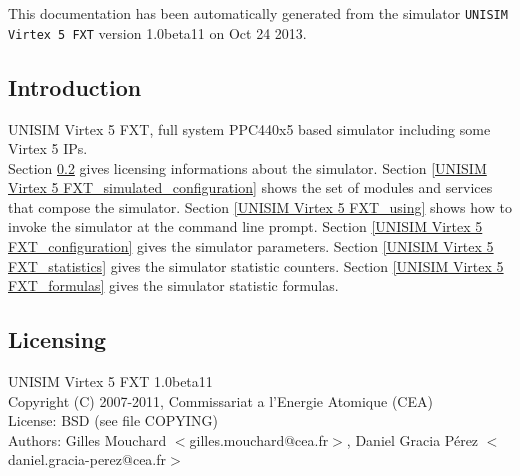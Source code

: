 This documentation has been automatically generated from the simulator \texttt{UNISIM Virtex 5 FXT} version 1.0beta11 on Oct 24 2013.
\subsection{Introduction}
UNISIM Virtex 5 FXT, full system PPC440x5 based simulator including some Virtex 5 IPs.\\
Section \ref{UNISIM Virtex 5 FXT_licensing} gives licensing informations about the simulator.
Section \ref{UNISIM Virtex 5 FXT_simulated_configuration} shows the set of modules and services that compose the simulator.
Section \ref{UNISIM Virtex 5 FXT_using} shows how to invoke the simulator at the command line prompt.
Section \ref{UNISIM Virtex 5 FXT_configuration} gives the simulator parameters.
Section \ref{UNISIM Virtex 5 FXT_statistics} gives the simulator statistic counters.
Section \ref{UNISIM Virtex 5 FXT_formulas} gives the simulator statistic formulas.
\subsection{Licensing}
\label{UNISIM Virtex 5 FXT_licensing}
UNISIM Virtex 5 FXT 1.0beta11\\
Copyright (C) 2007-2011, Commissariat a l'Energie Atomique (CEA)\\
License: BSD (see file COPYING)\\
Authors: Gilles Mouchard $<$gilles.mouchard@cea.fr$>$, Daniel Gracia P\'erez $<$daniel.gracia-perez@cea.fr$>$\\
